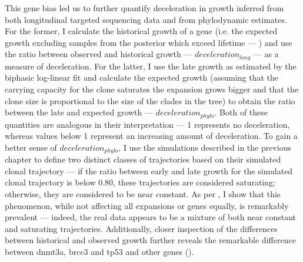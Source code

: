 \begin{figure}[!ht]
	\label{fig:exceeds-within-lifetime}
\end{figure}

\begin{figure}[!ht]
	\label{fig:fraction-clones-exceeding-lifetime}
\end{figure}

This gene bias led us to further quantify deceleration in growth inferred from both longitudinal targeted sequencing data and from phylodynamic estimates. For the former, I calculate the historical growth of a gene (i.e. the expected growth excluding samples from the posterior which exceed lifetime --- ) and use the ratio between observed and historical growth --- $deceleration_{long}$ --- as a measure of deceleration. For the latter, I use the late growth as estimated by the biphasic log-linear fit and calculate the expected growth (assuming that the carrying capacity for the clone saturates the expansion grows bigger and that the clone size is proportional to the size of the clades in the tree) to obtain the ratio between the late and expected growth --- $deceleration_{phylo}$. Both of these quantities are analogous in their interpretation --- 1 represents no deceleration, whereas values below 1 represent an increasing amount of deceleration. To gain a better sense of $deceleration_{phylo}$, I use the simulations described in the previous chapter to define two distinct classes of trajectories based on their simulated clonal trajectory --- if the ratio between early and late growth for the simulated clonal trajectory is below 0.80, these trajectories are considered saturating; otherwise, they are considered to be near constant. As per , I show that this phenomenon, while not affecting all expansions or genes equally, is remarkably prevalent --- indeed, the real data appears to be a mixture of both near constant and saturating trajectories. Additionally, closer inspection of the differences between historical and observed growth further reveals the remarkable difference between \ac{dnmt3a}, \ac{brcc3} and \ac{tp53} and other genes ().

